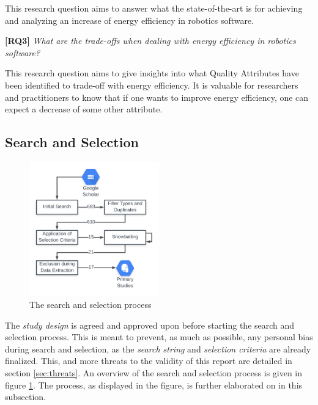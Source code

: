 \vspace{5mm}

This research question aims to answer what the state-of-the-art is for achieving and analyzing an increase of energy efficiency in robotics software.

\vspace{5mm}

\textbf{[RQ3]} \textit{What are the trade-offs when dealing with energy efficiency in robotics software?}

\vspace{5mm}

This research question aims to give insights into what Quality Attributes have been identified to trade-off with energy efficiency. 
It is valuable for researchers and practitioners to know that if one wants to improve energy efficiency, 
one can expect a decrease of some other attribute.

\subsection{Search and Selection}
\label{sec:study_design:search_selection}
\begin{figure}
    \centering
    \includegraphics[width=0.5\textwidth]{figures/selection_process_var2.png}
    \caption{The search and selection process}
    \label{fig:search_selec_process}
\end{figure}
 
The \textit{study design} is agreed and approved upon before starting the search and selection process. 
This is meant to prevent, as much as possible, any personal bias during search and selection, as the \textit{search string} and \textit{selection criteria} are already finalized.
This, and more threats to the validity of this report are detailed in section \ref{sec:threats}.
An overview of the search and selection process is given in figure \ref{fig:search_selec_process}.
The process, as displayed in the figure, is further elaborated on in this subsection.

